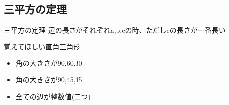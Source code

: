 \documentclass[10pt]{jsarticle}
\begin{document}
\subsection{三平方の定理}
\begin{itembox}[l]{三平方の定理}
	辺の長さがそれぞれa,b,cの時、ただしcの長さが一番長い
	\\
\end{itembox}

\begin{itembox}[l]{覚えてほしい直角三角形}
	\begin{multicols}{2}
		\begin{itemize}
			\item 角の大きさが90,60,30
			\item 角の大きさが90,45,45
			\item 全ての辺が整数値(二つ)
		\end{itemize}
	\end{multicols}
\end{itembox}
\end{document}
